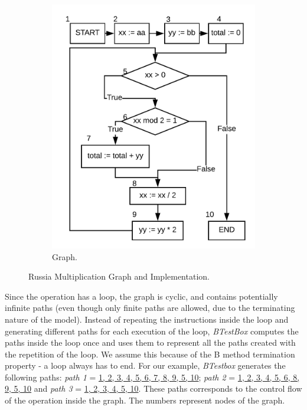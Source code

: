 \documentclass[runningheads]{llncs}
\begin{document}
\begin{figure}
\begin{minipage}{0.45\textwidth}
\begin{subfigure}{\textwidth}
\includegraphics[width = \textwidth]{imagens/lacoGrafo.png}
\caption{Graph.}
\label{fig:russianMultGraph}
\end{subfigure}
\end{minipage}
\caption{Russia Multiplication Graph and Implementation.}
\end{figure}
Since the operation has a loop, the graph is cyclic, and contains potentially infinite paths (even though only finite paths are allowed, due to the terminating nature of the model). 
Instead of repeating the instructions inside the loop and generating different paths for each execution of the loop, \textit{BTestBox} computes the paths inside the loop once and uses them to represent all the paths created with the repetition of the loop. 
We assume this because of the B method termination property - a loop always has to end.
For our example, \textit{BTestbox} generates the following paths: \textit{path 1} = \ul{1, 2, 3, 4, 5, 6, 7, 8, 9, 5, 10};  \textit{path 2} = \ul{1, 2, 3, 4, 5, 6, 8, 9, 5, 10} and \textit{path 3} = \ul{1, 2, 3, 4, 5, 10}.
These paths corresponds to the control flow of the operation inside the graph. The numbers represent nodes of the graph.
\end{document}
